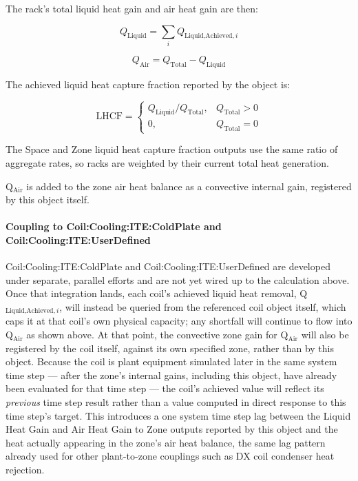 The rack's total liquid heat gain and air heat gain are then:

\begin{equation}
Q_{\textrm{Liquid}} = \sum_i Q_{\textrm{Liquid,Achieved},i}
\end{equation}

\begin{equation}
Q_{\textrm{Air}} = Q_{\textrm{Total}} - Q_{\textrm{Liquid}}
\end{equation}

The achieved liquid heat capture fraction reported by the object is:

\begin{equation}
\textrm{LHCF} =
\begin{cases}
Q_{\textrm{Liquid}} / Q_{\textrm{Total}}, & Q_{\textrm{Total}} > 0 \\
0, & Q_{\textrm{Total}} = 0
\end{cases}
\end{equation}

The Space and Zone liquid heat capture fraction outputs use the same ratio of aggregate rates, so racks are weighted by their current total heat generation.

Q$_{\textrm{Air}}$ is added to the zone air heat balance as a convective internal gain, registered by this object itself.

\paragraph{Coupling to Coil:Cooling:ITE:ColdPlate and Coil:Cooling:ITE:UserDefined}\label{coupling-to-coil-cooling-ite-coldplate-and-userdefined}

Coil:Cooling:ITE:ColdPlate and Coil:Cooling:ITE:UserDefined are developed under separate, parallel efforts and are not yet wired up to the calculation above. Once that integration lands, each coil's achieved liquid heat removal, Q$_{\textrm{Liquid,Achieved},i}$, will instead be queried from the referenced coil object itself, which caps it at that coil's own physical capacity; any shortfall will continue to flow into Q$_{\textrm{Air}}$ as shown above. At that point, the convective zone gain for Q$_{\textrm{Air}}$ will also be registered by the coil itself, against its own specified zone, rather than by this object. Because the coil is plant equipment simulated later in the same system time step --- after the zone's internal gains, including this object, have already been evaluated for that time step --- the coil's achieved value will reflect its \emph{previous} time step result rather than a value computed in direct response to this time step's target. This introduces a one system time step lag between the Liquid Heat Gain and Air Heat Gain to Zone outputs reported by this object and the heat actually appearing in the zone's air heat balance, the same lag pattern already used for other plant-to-zone couplings such as DX coil condenser heat rejection.



